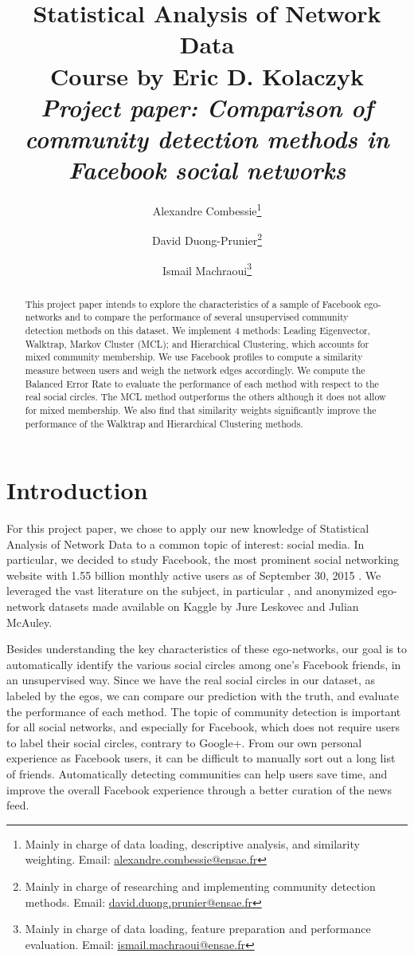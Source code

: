 \documentclass[11pt]{article}       %
\title{Statistical Analysis of Network Data  \\ Course by Eric D. Kolaczyk \\ \emph{Project paper: Comparison of community detection methods in Facebook social networks}}
\author{Alexandre Combessie\footnote{Mainly in charge of data loading, descriptive analysis, and similarity weighting. Email: \href{mailto:alexandre.combessie@ensae.fr}{alexandre.combessie@ensae.fr} }
  \and
  David Duong-Prunier\footnote{Mainly in charge of researching and implementing community detection methods. Email: \href{mailto:david.duong.prunier@ensae.fr}{david.duong.prunier@ensae.fr}}
  \and
    Ismail Machraoui\footnote{Mainly in charge of data loading, feature preparation and performance evaluation. Email: \href{mailto:ismail.machraoui@ensae.fr}{ismail.machraoui@ensae.fr}}
    }
\begin{document}
\maketitle
\begin{abstract}
This project paper intends to explore the characteristics of a sample of Facebook ego-networks and to compare the performance of several unsupervised community detection methods on this dataset. We implement 4 methods: Leading Eigenvector, Walktrap, Markov Cluster (MCL); and Hierarchical Clustering, which accounts for mixed community membership. We use Facebook profiles to compute a similarity measure between users and weigh the network edges accordingly. We compute the Balanced Error Rate to evaluate the performance of each method with respect to the real social circles. The MCL method outperforms the others although it does not allow for mixed membership. We also find that similarity weights significantly improve the performance of the Walktrap and Hierarchical Clustering methods.

\end{abstract}


\section{Introduction}

For this project paper, we chose to apply our new knowledge of Statistical Analysis of Network Data \cite{kolaczyk2009statistical, kolaczyk2014statistical} to a common topic of interest: social media. In particular, we decided to study Facebook, the most prominent social networking website with 1.55 billion monthly active users as of September 30, 2015 \cite{facebookstat}. We leveraged the vast literature on the subject, in particular \cite{leskovec2012learning, mcauley2014discovering}, and anonymized ego-network datasets made available on Kaggle \cite{dataset} by Jure Leskovec and Julian McAuley. 

Besides understanding the key characteristics of these ego-networks, our goal is to automatically identify the various social circles among one's Facebook friends, in an unsupervised way. Since we have the real social circles in our dataset, as labeled by the egos, we can compare our prediction with the truth, and evaluate the performance of each method. The topic of community detection is important for all social networks, and especially for Facebook, which does not require users to label their social circles, contrary to Google+. From our own personal experience as Facebook users, it can be difficult to manually sort out a long list of friends. Automatically detecting communities can help users save time, and improve the overall Facebook experience through a better curation of the news feed.
\end{document}
